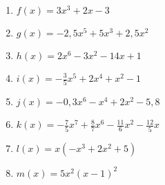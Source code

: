 \begin{Exercise}[title={Gib das Verhalten für \(x\to \pm \infty \) an}, label=ganzVerA1]

	\begin{minipage}{\textwidth}
		\begin{minipage}{0.5\textwidth}
			\begin{enumerate}[label=\alph*)]
				\item \(f(x)=3x^3+2x-3\)
				\item \(g(x)=-2,5x^5+5x^3+2,5x^2\)
				\item \(h(x)=2x^6-3x^2-14x+1\)
				\item \(i(x)=-\frac{3}{5}x^5+2x^4+x^2-1\)
			\end{enumerate}
		\end{minipage}%
		\begin{minipage}{0.5\textwidth}
			\begin{enumerate}[label=\alph*)]
				\setcounter{enumi}{4}
				\item \(j(x)=-0,3x^6-x^4+2x^2-5,8\)
				\item \(k(x)=-\frac{7}{5}x^7+\frac{8}{7}x^6-\frac{11}{6}x^2-\frac{12}{5}x\)
				\item \(l(x)=x\left(-x^3+2x^2+5\right)\)
				\item \(m(x)=5x^2\left(x-1\right)^2\)
			\end{enumerate}
		\end{minipage}%
	\end{minipage}
\end{Exercise}
\newpage
